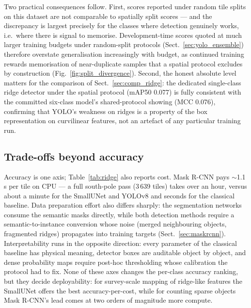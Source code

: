 Two practical consequences follow. First, scores reported under random tile splits on this dataset are not comparable to spatially split scores --- and the discrepancy is largest precisely for the classes where detection genuinely works, i.e.\ where there is signal to memorise. Development-time scores quoted at much larger training budgets under random-split protocols (Sect.~\ref{sec:yolo_ensemble}) therefore overstate generalisation increasingly with budget, as continued training rewards memorisation of near-duplicate samples that a spatial protocol excludes by construction (Fig.~\ref{fig:split_divergence}). Second, the honest absolute level matters for the comparison of Sect.~\ref{sec:comp_ridge}: the dedicated single-class ridge detector under the spatial protocol (mAP50 0.077) is fully consistent with the committed six-class model's shared-protocol showing (MCC 0.076), confirming that YOLO's weakness on ridges is a property of the box representation on curvilinear features, not an artefact of any particular training run.


\subsection{Trade-offs beyond accuracy}
\label{sec:tradeoffs}

Accuracy is one axis; Table~\ref{tab:ridge} also reports cost. Mask R-CNN pays $\sim$1.1\,s per tile on CPU --- a full south-pole pass (3\,639 tiles) takes over an hour, versus about a minute for the SmallUNet and YOLOv8 and seconds for the classical baseline. Data preparation effort also differs sharply: the segmentation networks consume the semantic masks directly, while both detection methods require a semantic-to-instance conversion whose noise (merged neighbouring objects, fragmented ridges) propagates into training targets (Sect.~\ref{sec:maskrcnn}). Interpretability runs in the opposite direction: every parameter of the classical baseline has physical meaning, detector boxes are auditable object by object, and dense probability maps require post-hoc thresholding whose calibration the protocol had to fix. None of these axes changes the per-class accuracy ranking, but they decide deployability: for survey-scale mapping of ridge-like features the SmallUNet offers the best accuracy-per-cost, while for counting sparse objects Mask R-CNN's lead comes at two orders of magnitude more compute.
